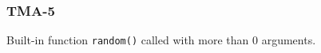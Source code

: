 \subsubsection{TMA-5}\label{sec:error_code_tma_5}

Built-in function \texttt{random()} called with more than 0 arguments.



